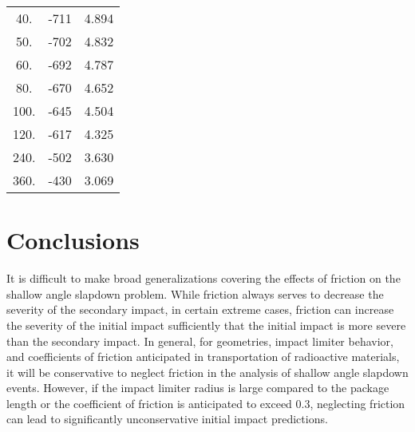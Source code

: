 \begin{table}
\begin{center}
\begin{tabular}{||c|c|c||}
         40.                &-711                  &4.894\\
         50.                &-702                  &4.832\\
         60.                &-692                  &4.787\\
         80.                &-670                  &4.652\\
        100.                &-645                  &4.504\\
        120.                &-617                  &4.325\\
        240.                &-502                  &3.630\\
        360.                &-430                  &3.069\\
\hline
\end{tabular}
\end{center}
\end{table}

\section{Conclusions}

     It is difficult to make broad generalizations covering the
effects of friction on the shallow angle slapdown problem.  While
friction always serves to decrease the severity of the secondary
impact, in certain extreme cases, friction can increase the severity
of the initial impact sufficiently that the initial impact is more
severe than the secondary
impact.  In general, for geometries, impact
limiter behavior, and coefficients of friction anticipated in
transportation of radioactive materials, it will be conservative to
neglect friction in the analysis of shallow angle slapdown events.
However, if the impact limiter radius is large compared to the package
length or the coefficient of friction is anticipated to exceed 0.3,
neglecting friction can lead to significantly
unconservative initial impact predictions.
